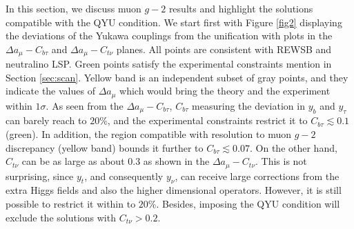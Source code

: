 \documentclass[12pt]{article}
\begin{document}
In this section, we discuss muon $g-2$ results and highlight the solutions compatible with the QYU condition. We start first with Figure \ref{fig2} displaying the deviations of the Yukawa couplings from the unification with plots in the $\Delta a_{\mu}-C_{b\tau}$ and $\Delta a_{\mu}-C_{t\nu}$ planes. All points are consistent with REWSB and neutralino LSP. Green points satisfy the experimental constraints mention in Section \ref{sec:scan}. Yellow band is an independent subset of gray points, and they indicate the values of $\Delta a_{\mu}$ which would bring the theory and the experiment within $1\sigma$. As seen from the $\Delta a_{\mu}-C_{b\tau}$, $C_{b\tau}$ measuring the deviation in $y_{b}$ and $y_{\tau}$ can barely reach to $20\%$, and the experimental constraints restrict it to $C_{b\tau} \lesssim 0.1$ (green). In addition, the region compatible with resolution to muon $g-2$ discrepancy (yellow band) bounds it further to $C_{b\tau} \lesssim 0.07$. On the other hand, $C_{t\nu}$ can be as large as about $0.3$ as shown in the $\Delta a_{\mu}-C_{t\nu}$. This is not surprising, since $y_{t}$, and consequently $y_{\nu}$, can receive large corrections from the extra Higgs fields and also the higher dimensional operators. However, it is still possible to restrict it within to $20\%$. Besides, imposing the QYU condition will exclude the solutions with $C_{t\nu} > 0.2$.
\end{document}
